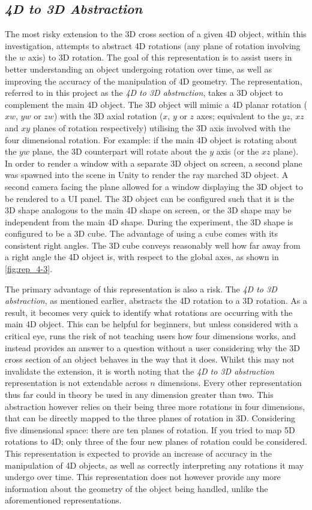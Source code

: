 \documentclass{l4proj}
\begin{document}
\subsection{\textit{4D to 3D Abstraction}}
The most risky extension to the 3D cross section of a given 4D object, within this investigation, attempts to abstract 4D rotations (any plane of rotation involving the \(w\) axis) to 3D rotation. The goal of this representation is to assist users in better understanding an object undergoing rotation over time, as well as improving the accuracy of the manipulation of 4D geometry.
The representation, referred to in this project as the \textit{4D to 3D abstraction}, takes a 3D object to complement the main 4D object. The 3D object will mimic a 4D planar rotation ($xw$, $yw$ or $zw$) with the 3D axial rotation ($x$, $y$ or $z$ axes; equivalent to the $yz$, $xz$ and $xy$ planes of rotation respectively) utilising the 3D axis involved with the four dimensional rotation. For example: if the main 4D object is rotating about the $yw$ plane, the 3D counterpart will rotate about the $y$ axis (or the $xz$ plane).
In order to render a window with a separate 3D object on screen, a second plane was spawned into the scene in Unity to render the ray marched 3D object. A second camera facing the plane allowed for a window displaying the 3D object to be rendered to a UI panel.
The 3D object can be configured such that it is the 3D shape analogous to the main 4D shape on screen, or the 3D shape may be independent from the main 4D shape. During the experiment, the 3D shape is configured to be a 3D cube. 
The advantage of using a cube comes with its consistent right angles. The 3D cube conveys reasonably well how far away from a right angle the 4D object is, with respect to the global axes, as shown in \cref{fig:rep_4-3}.

The primary advantage of this representation is also a risk. The \textit{4D to 3D abstraction}, as mentioned earlier, abstracts the 4D rotation to a 3D rotation. As a result, it becomes very quick to identify what rotations are occurring with the main 4D object. This can be helpful for beginners, but unless considered with a critical eye, runs the risk of not teaching users how four dimensions works, and instead provides an answer to a question without a user considering why the 3D cross section of an object behaves in the way that it does.
Whilst this may not invalidate the extension, it is worth noting that the \textit{4D to 3D abstraction} representation is not extendable across \(n\) dimensions. Every other representation thus far could in theory be used in any dimension greater than two. This abstraction however relies on their being three more rotations in four dimensions, that can be directly mapped to the three planes of rotation in 3D. Considering five dimensional space: there are ten planes of rotation. If you tried to map 5D rotations to 4D; only three of the four new planes of rotation could be considered.
This representation is expected to provide an increase of accuracy in the manipulation of 4D objects, as well as correctly interpreting any rotations it may undergo over time. This representation does not however provide any more information about the geometry of the object being handled, unlike the aforementioned representations.
\end{document}
